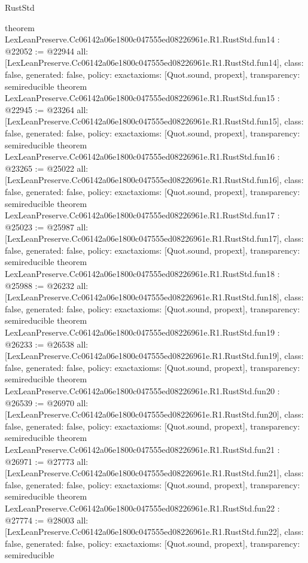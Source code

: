 \begin{lexlean}{RustStd}
\begin{coremodule}
{}
theorem LexLeanPreserve.Cc06142a06e1800c047555ed08226961e.R1.RustStd.fun14 : @22052 := @22944 {
  all: [LexLeanPreserve.Cc06142a06e1800c047555ed08226961e.R1.RustStd.fun14],
  class: false,
  generated: false,
  policy: exact{axioms: [Quot.sound, propext]},
  transparency: semireducible
}
theorem LexLeanPreserve.Cc06142a06e1800c047555ed08226961e.R1.RustStd.fun15 : @22945 := @23264 {
  all: [LexLeanPreserve.Cc06142a06e1800c047555ed08226961e.R1.RustStd.fun15],
  class: false,
  generated: false,
  policy: exact{axioms: [Quot.sound, propext]},
  transparency: semireducible
}
theorem LexLeanPreserve.Cc06142a06e1800c047555ed08226961e.R1.RustStd.fun16 : @23265 := @25022 {
  all: [LexLeanPreserve.Cc06142a06e1800c047555ed08226961e.R1.RustStd.fun16],
  class: false,
  generated: false,
  policy: exact{axioms: [Quot.sound, propext]},
  transparency: semireducible
}
theorem LexLeanPreserve.Cc06142a06e1800c047555ed08226961e.R1.RustStd.fun17 : @25023 := @25987 {
  all: [LexLeanPreserve.Cc06142a06e1800c047555ed08226961e.R1.RustStd.fun17],
  class: false,
  generated: false,
  policy: exact{axioms: [Quot.sound, propext]},
  transparency: semireducible
}
theorem LexLeanPreserve.Cc06142a06e1800c047555ed08226961e.R1.RustStd.fun18 : @25988 := @26232 {
  all: [LexLeanPreserve.Cc06142a06e1800c047555ed08226961e.R1.RustStd.fun18],
  class: false,
  generated: false,
  policy: exact{axioms: [Quot.sound, propext]},
  transparency: semireducible
}
theorem LexLeanPreserve.Cc06142a06e1800c047555ed08226961e.R1.RustStd.fun19 : @26233 := @26538 {
  all: [LexLeanPreserve.Cc06142a06e1800c047555ed08226961e.R1.RustStd.fun19],
  class: false,
  generated: false,
  policy: exact{axioms: [Quot.sound, propext]},
  transparency: semireducible
}
theorem LexLeanPreserve.Cc06142a06e1800c047555ed08226961e.R1.RustStd.fun20 : @26539 := @26970 {
  all: [LexLeanPreserve.Cc06142a06e1800c047555ed08226961e.R1.RustStd.fun20],
  class: false,
  generated: false,
  policy: exact{axioms: [Quot.sound, propext]},
  transparency: semireducible
}
theorem LexLeanPreserve.Cc06142a06e1800c047555ed08226961e.R1.RustStd.fun21 : @26971 := @27773 {
  all: [LexLeanPreserve.Cc06142a06e1800c047555ed08226961e.R1.RustStd.fun21],
  class: false,
  generated: false,
  policy: exact{axioms: [Quot.sound, propext]},
  transparency: semireducible
}
theorem LexLeanPreserve.Cc06142a06e1800c047555ed08226961e.R1.RustStd.fun22 : @27774 := @28003 {
  all: [LexLeanPreserve.Cc06142a06e1800c047555ed08226961e.R1.RustStd.fun22],
  class: false,
  generated: false,
  policy: exact{axioms: [Quot.sound, propext]},
  transparency: semireducible
}
\end{coremodule}
\end{lexlean}
